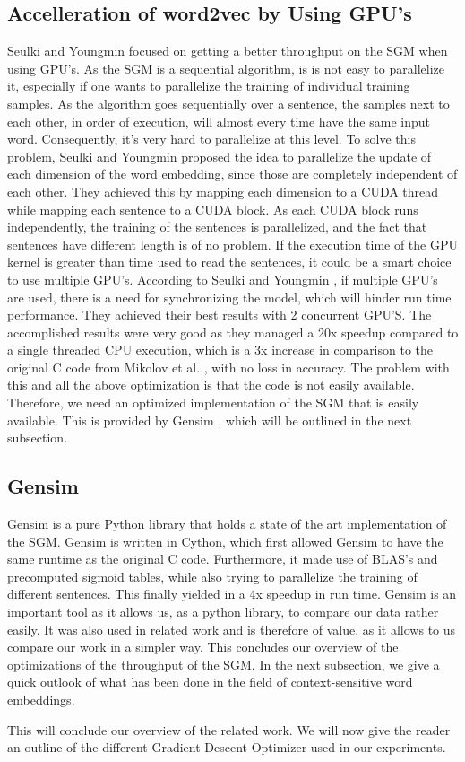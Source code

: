 \subsection{Accelleration of word2vec by Using GPU's}
Seulki and Youngmin \cite{gpu} focused on getting a better throughput on the SGM when using GPU's. As the SGM is a sequential algorithm, is is not easy to parallelize it, especially if one wants to parallelize the training of individual training samples. As the algorithm goes sequentially over a sentence, the samples next to each other, in order of execution, will almost every time have the same input word. Consequently, it's very hard to parallelize at this level. To solve this problem, Seulki and Youngmin \cite{gpu} proposed the idea to parallelize the update of each dimension of the word embedding, since those are completely independent of each other. They achieved this by mapping each dimension to a CUDA thread while mapping each sentence to a CUDA block. As each CUDA block runs independently, the training of the sentences is parallelized, and the fact that sentences have different length is of no problem. If the execution time of the GPU kernel is greater than time used to read the sentences, it could be a smart choice to use multiple GPU's. According to Seulki and Youngmin \cite{gpu}, if multiple GPU's are used, there is a need for synchronizing the model, which will hinder run time performance. They achieved their best results with 2 concurrent GPU'S. The accomplished results were very good as they managed a 20x speedup compared to a single threaded CPU execution, which is a 3x increase in comparison to the original C code from Mikolov et al. \cite{mikolov2}, with no loss in accuracy. The problem with this and all the above optimization is that the code is not easily available. Therefore, we need an optimized implementation of the SGM that is easily available. This is provided by Gensim \cite{gensim}, which will be outlined in the next subsection.
\subsection{Gensim}\label{ssec:gensim}
Gensim \cite{gensim} is a pure Python library that holds a state of the art implementation of the SGM. Gensim is written in Cython, which first allowed Gensim to have the same runtime as the original C code. Furthermore, it made use of BLAS's and precomputed sigmoid tables, while also trying to parallelize the training of different sentences. This finally yielded in a 4x speedup in run time. Gensim is an important tool as it allows us, as a python library, to compare our data rather easily. It was also used in related work \cite{intel} and is therefore of value, as it allows to us compare our work in a simpler way. This concludes our overview of the optimizations of the throughput of the SGM. In the next subsection, we give a quick outlook of what has been done in the field of context-sensitive word embeddings.

This will conclude our overview of the related work. We will now give the reader an outline of the different Gradient Descent Optimizer used in our experiments.